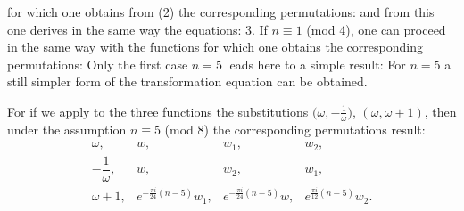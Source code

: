 for which one obtains from (2) the corresponding permutations:
and from this one derives in the same way the equations:
3. If $n \equiv 1$ (mod 4), one can proceed in the same way with the functions
for which one obtains the corresponding permutations:
Only the first case $n=5$ leads here to a simple result:
For $n=5$ a still simpler form of the transformation equation can be obtained.

For if we apply to the three functions
the substitutions $\bigl(\omega, -\frac{1}{\omega}\bigr)$, $(\omega, \omega+1)$, then under the assumption $n \equiv 5$ (mod 8) the corresponding permutations result:
\[
\begin{array}{llll}
\omega, & w, & w_1, & w_2,\\
-\dfrac{1}{\omega}, & w, & w_2, & w_1,\\
\omega+1, & e^{-\frac{\pi i}{24}(n-5)}w_1, & e^{-\frac{\pi i}{24}(n-5)}w, & e^{\frac{\pi i}{12}(n-5)}w_2.
\end{array}
\]
